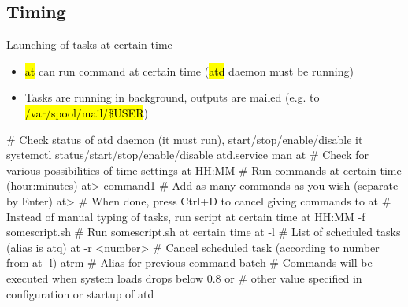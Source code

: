 \documentclass[compress, ucs, xelatex, 11pt, xcolor=svgnames, aspectratio=169,
	hyperref={
		bookmarks=true,
		unicode=true,
		colorlinks=true,
		pdftitle={Linux, command line and MetaCentrum},
		plainpages=false,
		pdfauthor={Vojtech Zeisek},
		pdfsubject={Course about use of Linux command line, writing shell scripts and using MetaCentrum of CESNET},
		pdfcreator={XeLaTeX},
		pdfkeywords={Linux, GNU, BASH, shell, command line, MetaCentrum},
		linkcolor=DarkRed, %
		anchorcolor=DarkBlue, %
		citecolor=Indigo, %
		filecolor=NavyBlue, %
		menucolor=DarkMagenta, %
		urlcolor=DarkBlue, %
		pdftex},
	url={hyphens, lowtilde} %
	]{beamer}
\renewcommand{\texttt}[1]{\hl{\ttfamily #1}}
\begin{document}
\subsection{Timing}

\begin{frame}[fragile]{Launching of tasks at certain time}
	\begin{itemize}
		\item \texttt{at} can run command at certain time (\texttt{atd} daemon must be running)
		\item Tasks are running in background, outputs are mailed (e.g. to \texttt{/var/spool/mail/\$USER})
	\end{itemize}
	\vfill
	\begin{bashcode}
    # Check status of atd daemon (it must run), start/stop/enable/disable it
    systemctl status/start/stop/enable/disable atd.service
    man at # Check for various possibilities of time settings
    at HH:MM # Run commands at certain time (hour:minutes)
    at> command1 # Add as many commands as you wish (separate by Enter)
    at> # When done, press Ctrl+D to cancel giving commands to at
    # Instead of manual typing of tasks, run script at certain time
    at HH:MM -f somescript.sh # Run somescript.sh at certain time
    at -l # List of scheduled tasks (alias is atq)
    at -r <number> # Cancel scheduled task (according to number from at -l)
    atrm # Alias for previous command
    batch # Commands will be executed when system loads drops below 0.8 or
          # other value specified in configuration or startup of atd
	\end{bashcode}
\end{frame}
\end{document}
